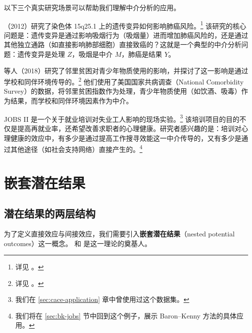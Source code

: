 \fboxsep=6pt\fboxrule=1pt
\noindent{}

以下三个真实研究场景可以帮助我们理解中介分析的应用。

\begin{Example}
\Vanderweele{}（2012）研究了染色体 15q25.1 上的遗传变异如何影响肺癌风险。\footnote{详见 \cite{Vanderweele::2012genetic}。} 该研究的核心问题是：遗传变异是通过影响吸烟行为（吸烟量）进而增加肺癌风险的，还是通过其他独立通路（如直接影响肺部细胞）直接致癌的？这就是一个典型的中介分析问题：遗传变异是处理 $Z$，吸烟是中介 $M$，肺癌是结果 $Y$。
\end{Example}

\begin{Example}
\Rudolf{} 等人（2018）研究了邻里贫困对青少年物质使用的影响，并探讨了这一影响是通过学校和同伴环境传导的。\footnote{详见 \cite{rudolph2018causal}。} 他们使用了美国国家共病调查（National Comorbidity Survey）的数据，将邻里贫困指数作为处理，青少年物质使用（如饮酒、吸毒）作为结果，而学校和同伴环境因素作为中介。
\end{Example}

\begin{Example}
JOBS II 是一个关于就业培训对失业工人影响的现场实验。\footnote{我们在 \cref{sec:cace-application} 章中曾使用过这个数据集。} 该培训项目的目的不仅是提高再就业率，还希望改善求职者的心理健康。研究者感兴趣的是：培训对心理健康的效应中，有多少是通过提高工作搜寻效能这一中介传导的，又有多少是通过其他途径（如社会支持网络）直接产生的。\footnote{我们将在 \cref{sec:bk-jobs} 节中回到这个例子，展示 Baron--Kenny 方法的具体应用。}
\end{Example}

\section{嵌套潜在结果}

\subsection{潜在结果的两层结构}

为了定义直接效应与间接效应，我们需要引入\textbf{嵌套潜在结果}（nested potential outcomes）这一概念。 和  是这一理论的奠基人。

